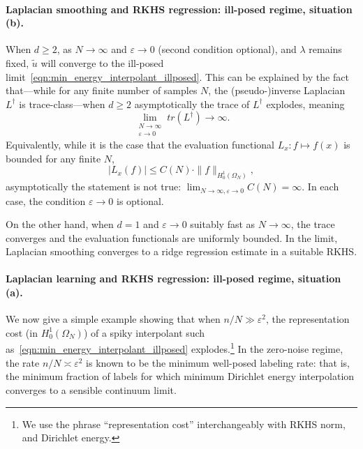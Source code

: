 \documentclass{article}
\newcommand{\1}{\mathbf{1}}
\newcommand{\wt}[1]{\widetilde{#1}}
\theoremstyle{definition}
\theoremstyle{remark}
\begin{document}
\paragraph{Laplacian smoothing and RKHS regression: ill-posed regime, situation (b).}
When $d \geq 2$, as $N \to \infty$ and $\varepsilon \to 0$ (second condition optional), and $\lambda$ remains fixed, $\wt{u}$ will converge to the ill-posed limit~\eqref{eqn:min_energy_interpolant_illposed}. This can be explained by the fact that---while for any finite number of samples $N$, the (pseudo-)inverse Laplacian $L^{\dagger}$ is trace-class---when $d \geq 2$ asymptotically the trace of $L^{\dagger}$ explodes, meaning
\begin{equation*}
\lim_{\substack{N \to \infty \\ \varepsilon \to 0}} tr(L^{\dagger}) \to \infty.
\end{equation*}
Equivalently, while it is the case that the evaluation functional $L_x: f \mapsto f(x)$ is bounded for any finite $N$,
\begin{equation*}
|L_x(f)| \leq C(N) \cdot \|f\|_{H_0^1(\Omega_N)},
\end{equation*}
asymptotically the statement is not true: $\lim_{N \to \infty, \varepsilon \to 0} C(N) = \infty$. In each case, the condition $\varepsilon \to 0$ is optional.

On the other hand, when $d = 1$ and $\varepsilon \to 0$ suitably fast as $N \to \infty$, the trace converges and the evaluation functionals are uniformly bounded. In the limit, Laplacian smoothing converges to a ridge regression estimate in a suitable RKHS. 

\paragraph{Laplacian learning and RKHS regression: ill-posed regime, situation (a).}
We now give a simple example showing that when $n/N \gg \varepsilon^2$, the representation cost (in $H_0^1(\Omega_N)$) of a spiky interpolant such as~\eqref{eqn:min_energy_interpolant_illposed} explodes.\footnote{We use the phrase ``representation cost'' interchangeably with RKHS norm, and Dirichlet energy.} In the zero-noise regime, the rate $n/N \asymp \varepsilon^2$ is known to be the minimum well-posed labeling rate: that is, the minimum fraction of labels for which minimum Dirichlet energy interpolation converges to a sensible continuum limit. 
\end{document}

